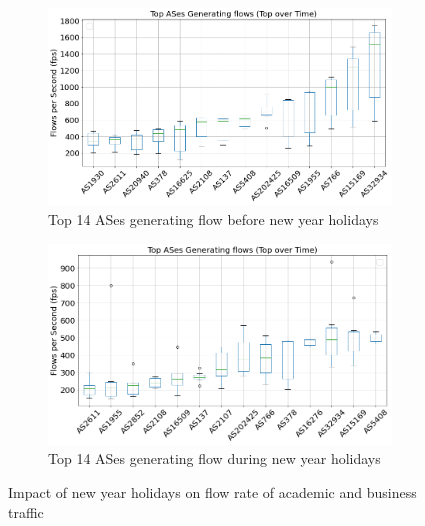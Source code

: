 \documentclass[10pt, journal, letterpaper]{IEEEtran}
\newcommand\linearFigSze{0.48}
\begin{document}
\begin{figure}
    \begin{subfigure}{\linearFigSze\textwidth}
          \centering
          \includegraphics[width=\columnwidth]{img/BCH2_top14AS_generating_fps.png}
          \caption{Top 14 ASes generating flow before new year holidays}
          \label{fig:BCH2_topAS_gen_fps}
    \end{subfigure}
    \begin{subfigure}{\linearFigSze\textwidth}
          \centering
          \includegraphics[width=\columnwidth]{img/CH2_top14AS_generating_fps.png}
          \caption{Top 14 ASes generating flow during new year holidays}
          \label{fig:CH2_topAS_gen_fps}
    \end{subfigure}
    \caption{Impact of new year holidays on flow rate of academic and business traffic}
    \label{fig:flowrate_topAS_gen_BCH_CH}
\end{figure}
\end{document}
